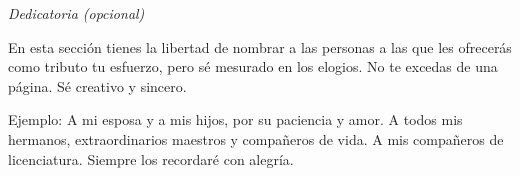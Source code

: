 
\thispagestyle{empty}
\setcounter{page}{0}

\hfill\emph{Dedicatoria (opcional)}

\noindent \textcolor[rgb]{0,0,1}{En esta sección tienes la libertad de nombrar a las personas a las que les ofrecerás como tributo tu esfuerzo, pero sé mesurado en los elogios. No te excedas de una página.  Sé creativo y sincero.}

\noindent \textcolor[rgb]{0,0,1}{Ejemplo:\newline
	A mi esposa y a mis hijos, por su paciencia y amor.\newline
	A todos mis hermanos, extraordinarios maestros y compañeros de vida.\newline
	A mis compañeros de licenciatura. Siempre los recordaré con alegría.}
